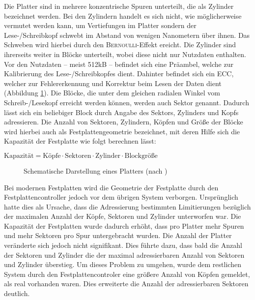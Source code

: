 Die Platter sind in mehrere konzentrische Spuren unterteilt, die als Zylinder bezeichnet werden. Bei den Zylindern handelt es sich nicht, wie möglicherweise
vermutet werden kann, um Vertiefungen im Platter sondern der Lese-/Schreibkopf schwebt im Abstand von wenigen Nanometern über ihnen. Das Schweben wird hierbei
durch den \textsc{Bernoulli}-Effekt ereicht. Die Zylinder sind ihrerseits weiter in Blöcke unterteilt, wobei diese nicht nur Nutzdaten enthalten. Vor den
Nutzdaten -- meist 512kB -- befindet sich eine Präambel, welche zur Kalibrierung des Lese-/Schreibkopfes dient. Dahinter befindet sich ein \ac{ECC}, welcher zur
Fehlererkennung und Korrektur beim Lesen der Daten dient (Abbildung \ref{img:hdd2}). Die Blöcke, die unter dem gleichen radialen Winkel vom Schreib-/Lesekopf
erreicht werden können, werden auch Sektor genannt. Dadurch lässt sich ein beliebiger Block durch Angabe des Sektors, Zylinders und Kopfs adressieren. Die Anzahl
von Sektoren, Zylindern, Köpfen und Größe der Blöcke wird hierbei auch als Festplattengeometrie bezeichnet, mit deren Hilfe sich die Kapazität der Festplatte wie
folgt berechnen lässt:

\begin{center}
$\text{Kapazität} = \text{Köpfe} \cdot \text{Sektoren} \cdot \text{Zylinder} \cdot \text{Blockgröße}$
\end{center}

\begin{figure}[b!]\centering
    \caption[Schematische Darstellung eines Platters]{Schematische Darstellung eines Platters (nach \textcite[100]{tanenbaum1})}
    \label{img:hdd2}
\end{figure}

Bei modernen Festplatten wird die Geometrie der Festplatte durch den Festplattencontroller jedoch vor dem übrigen System verborgen. Ursprünglich hatte dies als
Ursache, dass die Adressierung bestimmten Limitierungen bezüglich der maximalen Anzahl der Köpfe, Sektoren und Zylinder unterworfen war. Die Kapazität der
Festplatten wurde dadurch erhöht, dass pro Platter mehr Spuren und mehr Sektoren pro Spur untergebracht wurden. Die Anzahl der Platter veränderte sich jedoch
nicht signifikant. Dies führte dazu, dass bald die Anzahl der Sektoren und Zylinder die der maximal adressierbaren Anzahl von Sektoren und Zylinder überstieg. Um
dieses Problem zu umgehen, wurde dem restlichen System durch den Festplattencontroler eine größere Anzahl von Köpfen gemeldet, als real vorhanden waren. Dies
erweiterte die Anzahl der adressierbaren Sektoren deutlich.

